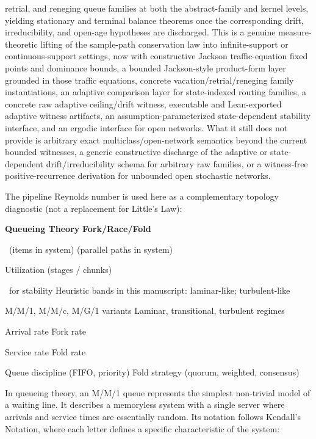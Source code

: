 \documentclass[
]{article}
\begin{document}
retrial, and reneging queue families at both the abstract-family and
kernel levels, yielding stationary and terminal balance theorems once
the corresponding drift, irreducibility, and open-age hypotheses are
discharged. This is a genuine measure-theoretic lifting of the
sample-path conservation law into infinite-support or continuous-support
settings, now with constructive Jackson traffic-equation fixed points
and dominance bounds, a bounded Jackson-style product-form layer
grounded in those traffic equations, concrete vacation/retrial/reneging
family instantiations, an adaptive comparison layer for state-indexed
routing families, a concrete raw adaptive ceiling/drift witness,
executable and Lean-exported adaptive witness artifacts, an
assumption-parameterized state-dependent stability interface, and an
ergodic interface for open networks. What it still does not provide is
arbitrary exact multiclass/open-network semantics beyond the current
bounded witnesses, a generic constructive discharge of the adaptive or
state-dependent drift/irreducibility schema for arbitrary raw families,
or a witness-free positive-recurrence derivation for unbounded open
stochastic networks.

The pipeline Reynolds number is used here as a complementary topology
diagnostic (not a replacement for Little's Law):

\textbf{Queueing Theory} \textbar{} \textbf{Fork/Race/Fold} \textbar{}

~(items in system) \textbar{} (parallel paths in system) \textbar{}

Utilization \textbar{} (stages / chunks) \textbar{}

~for stability \textbar{} Heuristic bands in this manuscript:
laminar-like; turbulent-like \textbar{}

M/M/1, M/M/c, M/G/1 variants \textbar{} Laminar, transitional, turbulent
regimes \textbar{}

Arrival rate \textbar{} Fork rate \textbar{}

Service rate \textbar{} Fold rate \textbar{}

Queue discipline (FIFO, priority) \textbar{} Fold strategy (quorum,
weighted, consensus) \textbar{}

In queueing theory, an M/M/1 queue represents the simplest non-trivial
model of a waiting line. It describes a memoryless system with a single
server where arrivals and service times are essentially random. Its
notation follows Kendall's Notation, where each letter defines a
specific characteristic of the system:
\end{document}
